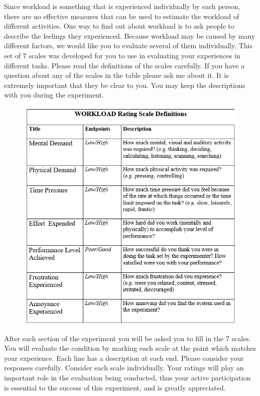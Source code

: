 \documentclass{l4proj}
\begin{document}
\begin{appendices}
Since workload is something that is experienced individually by each person, there are no effective measures that can be used to estimate the workload of different activities. One way to find out about workload is to ask people to describe the feelings they experienced. Because workload may be caused by many different factors, we would like you to evaluate several of them individually. This set of 7 scales was developed for you to use in evaluating your experiences in different tasks. Please read the definitions of the scales carefully. If you have a question about any of the scales in the table please ask me about it. It is extremely important that they be clear to you. You may keep the descriptions with you during the experiment.
\begin{figure}[!htb]
    \centering
    \includegraphics[scale = 0.6]{images/workload.png}
\end{figure}

After each section of the experiment you will be asked you to fill in the 7 scales. You will evaluate the condition by marking each scale at the point which matches your experience. Each line has a description at each end. Please consider your responses carefully. Consider each scale individually. Your ratings will play an important role in the evaluation being conducted, thus your active participation is essential to the success of this experiment, and is greatly appreciated.


\end{appendices}
\end{document}
